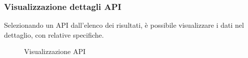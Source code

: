 \subsubsection{Visualizzazione dettagli API}
Selezionando un API dall'elenco dei risultati, è possibile visualizzare i dati nel dettaglio, con relative specifiche. 


\label{Visualizzazione API}
\begin{figure}[H]
	\centering
	\caption{Visualizzazione API}
\end{figure}


